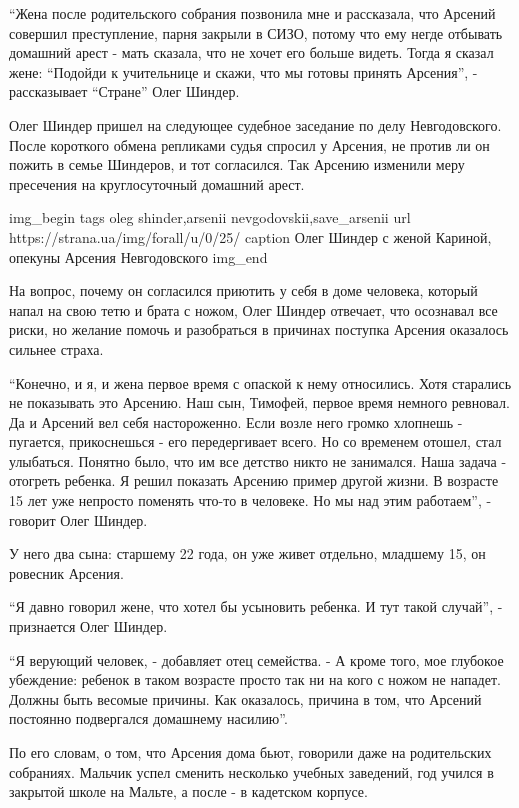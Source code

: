 “Жена после родительского собрания позвонила мне и рассказала, что Арсений
совершил преступление, парня закрыли в СИЗО, потому что ему негде отбывать
домашний арест - мать сказала, что не хочет его больше видеть. Тогда я сказал
жене: “Подойди к учительнице и скажи, что мы готовы принять Арсения”, -
рассказывает “Стране” Олег Шиндер. 

Олег Шиндер пришел на следующее судебное заседание по делу Невгодовского. После
короткого обмена репликами судья спросил у Арсения, не против ли он пожить в
семье Шиндеров, и тот согласился. Так Арсению изменили меру пресечения на
круглосуточный домашний арест.

\ifcmt
img_begin 
	tags oleg shinder,arsenii nevgodovskii,save_arsenii
	url https://strana.ua/img/forall/u/0/25/%
	caption Олег Шиндер с женой Кариной, опекуны Арсения Невгодовского
img_end
\fi

На вопрос, почему он согласился приютить у себя в доме человека, который напал
на свою тетю и брата с ножом, Олег Шиндер отвечает, что осознавал все риски, но
желание помочь и разобраться в причинах поступка Арсения оказалось сильнее
страха.

“Конечно, и я, и жена первое время с опаской к нему относились. Хотя старались
не показывать это Арсению. Наш сын, Тимофей, первое время немного ревновал. Да
и Арсений вел себя настороженно. Если возле него громко хлопнешь - пугается,
прикоснешься - его передергивает всего. Но со временем отошел, стал улыбаться.
Понятно было, что им все детство никто не занимался. Наша задача - отогреть
ребенка. Я решил показать Арсению пример другой жизни. В возрасте 15 лет уже
непросто поменять что-то в человеке. Но мы над этим работаем”, - говорит Олег
Шиндер. 

У него два сына: старшему 22 года, он уже живет отдельно, младшему 15, он ровесник Арсения.

“Я давно говорил жене, что хотел бы усыновить ребенка. И тут такой случай”, - признается Олег Шиндер. 

“Я верующий человек, - добавляет отец семейства. - А кроме того, мое глубокое убеждение: ребенок в таком возрасте просто так ни на кого с ножом не нападет. Должны быть весомые причины. Как оказалось, причина в том, что Арсений постоянно подвергался домашнему насилию”.

По его словам, о том, что Арсения дома бьют, говорили даже на родительских собраниях. Мальчик успел сменить несколько учебных заведений, год учился в закрытой школе на Мальте, а после - в кадетском корпусе. 

